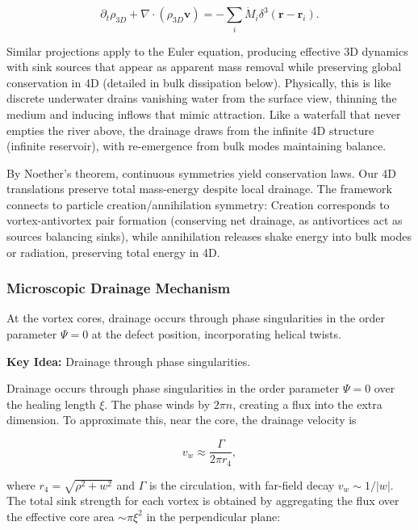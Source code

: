 \begin{equation}
\partial_t \rho_{3D} + \nabla \cdot (\rho_{3D} \mathbf{v}) = -\sum_i \dot{M}_i \delta^3(\mathbf{r} - \mathbf{r}_i).
\end{equation}

Similar projections apply to the Euler equation, producing effective 3D dynamics with sink sources that appear as apparent mass removal while preserving global conservation in 4D (detailed in bulk dissipation below). Physically, this is like discrete underwater drains vanishing water from the surface view, thinning the medium and inducing inflows that mimic attraction. Like a waterfall that never empties the river above, the drainage draws from the infinite 4D structure (infinite reservoir), with re-emergence from bulk modes maintaining balance.

By Noether's theorem, continuous symmetries yield conservation laws. Our 4D translations preserve total mass-energy despite local drainage. The framework connects to particle creation/annihilation symmetry: Creation corresponds to vortex-antivortex pair formation (conserving net drainage, as antivortices act as sources balancing sinks), while annihilation releases shake energy into bulk modes or radiation, preserving total energy in 4D.

\subsubsection{Microscopic Drainage Mechanism}
At the vortex cores, drainage occurs through phase singularities in the order parameter $\Psi=0$ at the defect position, incorporating helical twists.

\textbf{Key Idea:} Drainage through phase singularities.

Drainage occurs through phase singularities in the order parameter $\Psi=0$ over the healing length $\xi$. The phase winds by $2\pi n$, creating a flux into the extra dimension. To approximate this, near the core, the drainage velocity is

\begin{equation}
v_w \approx \frac{\Gamma}{2\pi r_4},
\end{equation}

where $r_4 = \sqrt{\rho^2 + w^2}$ and $\Gamma$ is the circulation, with far-field decay $v_w \sim 1/|w|$. The total sink strength for each vortex is obtained by aggregating the flux over the effective core area $\sim \pi \xi^2$ in the perpendicular plane:

